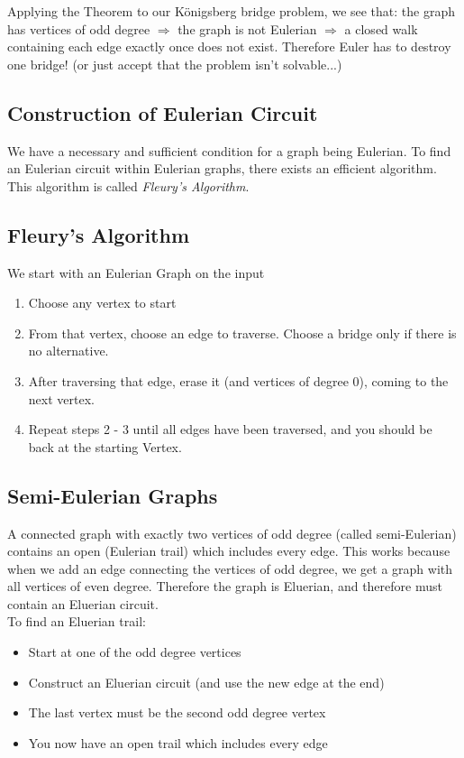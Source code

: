 Applying the Theorem to our K\"{o}nigsberg bridge problem, we see that: the graph has vertices of odd degree $\Rightarrow$ the graph is not Eulerian $\Rightarrow$ a closed walk containing each edge exactly once does not exist. Therefore Euler has to destroy one bridge! (or just accept that the problem isn't solvable...)

\subsection{Construction of Eulerian Circuit}
We have a necessary and sufficient condition for a graph being Eulerian. To find an Eulerian circuit within Eulerian graphs, there exists an efficient algorithm. This algorithm is called \textit{Fleury's Algorithm}. 

\subsection*{Fleury's Algorithm}
We start with an Eulerian Graph on the input
\begin{enumerate}
    \item Choose any vertex to start
    \item From that vertex, choose an edge to traverse. Choose a bridge only if there is no alternative.
    \item After traversing that edge, erase it (and vertices of degree 0), coming to the next vertex.
    \item Repeat steps 2 - 3 until all edges have been traversed, and you should be back at the starting Vertex. 
\end{enumerate}

\subsection{Semi-Eulerian Graphs}
A connected graph with exactly two vertices of odd degree (called semi-Eulerian) contains an open (Eulerian trail) which includes every edge. This works because when we add an edge connecting the vertices of odd degree, we get a graph with all vertices of even degree. Therefore the graph is Eluerian, and therefore must contain an Eluerian circuit.\\

To find an Eluerian trail:
\begin{itemize}
    \item Start at one of the odd degree vertices
    \item Construct an Eluerian circuit (and use the new edge at the end)
    \item The last vertex must be the second odd degree vertex
    \item You now have an open trail which includes every edge
\end{itemize}

